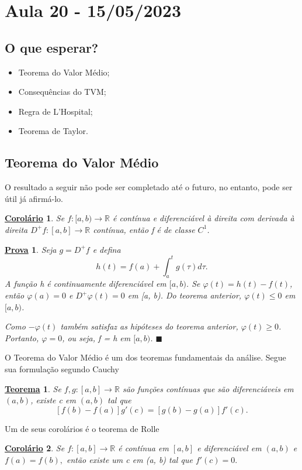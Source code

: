 \documentclass{article}
\newtheorem*{theorem*}{\underline{Teorema}}
\newtheorem*{proof*}{\underline{Prova}}
\newtheorem*{crl*}{\underline{Corol\'ario}}
\renewcommand\qedsymbol{$\blacksquare$}
\begin{document}
\section{Aula 20 - 15/05/2023}
\subsection{O que esperar?}
\begin{itemize}
  \item Teorema do Valor Médio;
  \item Consequências do TVM;
  \item Regra de L'Hospital;
  \item Teorema de Taylor.
\end{itemize}
\subsection{Teorema do Valor Médio}
  O resultado a seguir não pode ser completado até o futuro, no entanto, pode
ser útil já afirmá-lo.
\hypertarget{incomplete_1}{\begin{crl*}
  Se \(f:[a, b)\rightarrow \mathbb{R}\) é contínua e diferenciável à direita com 
  derivada à direita \(D^{+}f:[a, b]\rightarrow \mathbb{R}\) contínua, então f é de classe
  \(C^{1}\).
\end{crl*}}
\begin{proof*}
  Seja \(g = D^{+}f\) e defina 
    \[
      h(t) = f(a) + \int_{a}^{t} g(\tau )d\tau.
    \]
  A fun\c cão h é continuamente diferenciável em \([a, b)\). Se \(\varphi (t) = h(t)-f(t)\),
  então \(\varphi (a) = 0\) e \(D^{+}\varphi (t) = 0\) em [a, b). Do teorema anterior,
  \(\varphi (t)\leq 0\) em \([a, b)\).

  Como \(-\varphi (t)\) também satisfaz as hipóteses do teorema anterior, \(\varphi (t)\geq 0\).
  Portanto, \(\varphi = 0\), ou seja, f = h em \([a, b)\). \qedsymbol
\end{proof*}
  O Teorema do Valor Médio é um dos teoremas fundamentais da análise. Segue sua formula\c cão segundo
  Cauchy
  \hypertarget{cauchy_mvt}{
 \begin{theorem*}
   Se \(f, g:[a, b]\rightarrow \mathbb{R}\) são fun\c cões contínuas que são
   diferenciáveis em \((a, b)\), existe c em \((a, b)\) tal que 
     \[
       [f(b)-f(a)]g'(c) = [g(b)-g(a)]f'(c).
     \]
 \end{theorem*}}
  Um de seus corolários é o teorema de Rolle
  \hypertarget{Rolle}{
 \begin{crl*}
   Se \(f:[a, b]\rightarrow \mathbb{R}\) é contínua em \([a, b]\) e diferenciável
 em \((a, b)\) e \(f(a)=f(b),\) então existe um c em (a, b) tal que \(f'(c) = 0.\)
 \end{crl*}}
\end{document}
